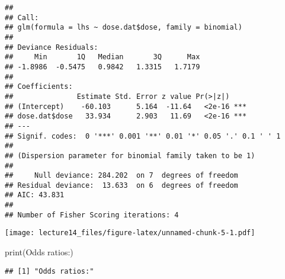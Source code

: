 \documentclass[
]{article}
\newenvironment{Shaded}{\begin{snugshade}}{\end{snugshade}}
\newcommand{\AttributeTok}[1]{\textcolor[rgb]{0.77,0.63,0.00}{#1}}
\newcommand{\CommentTok}[1]{\textcolor[rgb]{0.56,0.35,0.01}{\textit{#1}}}
\newcommand{\FunctionTok}[1]{\textcolor[rgb]{0.00,0.00,0.00}{#1}}
\newcommand{\NormalTok}[1]{#1}
\newcommand{\SpecialCharTok}[1]{\textcolor[rgb]{0.00,0.00,0.00}{#1}}
\newcommand{\StringTok}[1]{\textcolor[rgb]{0.31,0.60,0.02}{#1}}
\begin{document}
\begin{verbatim}
## 
## Call:
## glm(formula = lhs ~ dose.dat$dose, family = binomial)
## 
## Deviance Residuals: 
##     Min       1Q   Median       3Q      Max  
## -1.8986  -0.5475   0.9842   1.3315   1.7179  
## 
## Coefficients:
##               Estimate Std. Error z value Pr(>|z|)    
## (Intercept)    -60.103      5.164  -11.64   <2e-16 ***
## dose.dat$dose   33.934      2.903   11.69   <2e-16 ***
## ---
## Signif. codes:  0 '***' 0.001 '**' 0.01 '*' 0.05 '.' 0.1 ' ' 1
## 
## (Dispersion parameter for binomial family taken to be 1)
## 
##     Null deviance: 284.202  on 7  degrees of freedom
## Residual deviance:  13.633  on 6  degrees of freedom
## AIC: 43.831
## 
## Number of Fisher Scoring iterations: 4
\end{verbatim}

\begin{Shaded}
\end{Shaded}

\texttt{[image: lecture14\_files/figure-latex/unnamed-chunk-5-1.pdf]}

\begin{Shaded}
\begin{Highlighting}[]
\FunctionTok{print}\NormalTok{(}\StringTok{\textquotesingle{}Odds ratios:\textquotesingle{}}\NormalTok{)}
\end{Highlighting}
\end{Shaded}

\begin{verbatim}
## [1] "Odds ratios:"
\end{verbatim}

\begin{Shaded}
\end{Shaded}
\end{document}
